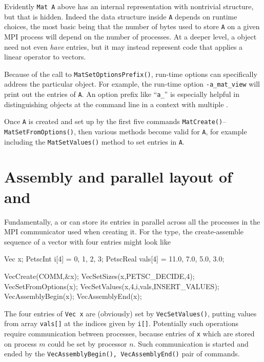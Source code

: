 Evidently \texttt{Mat A} above has an internal representation with nontrivial structure, but that is hidden.  Indeed the data structure inside \texttt{A} depends on runtime choices, the most basic being that the number of bytes used to store \texttt{A} on a given MPI process will depend on the number of processes.  At a deeper level, a \PETSc \pMat object need not even \emph{have} entries, but it may instead represent code that applies a linear operator to vectors.

Because of the call to \texttt{MatSetOptionsPrefix()}, run-time options can specifically address the particular \pMat object.  For example, the run-time option \texttt{-a\_mat\_view} will print out the entries of \texttt{A}.  An option prefix like ``\texttt{a\_}'' is especially helpful in distinguishing \pMat objects at the command line in a context with multiple \pMats.

Once \texttt{A} is created and set up by the first five commands \texttt{MatCreate()}--\texttt{MatSetFromOptions()}, then various methods become valid for \texttt{A}, for example including the \texttt{MatSetValues()} method to set entries in \texttt{A}.


\section{Assembly and parallel layout of \pVecs and \pMats}

Fundamentally, a \pVec or \pMat can store its entries in parallel across all the processes in the MPI communicator used when creating it.  For the \pVec type, the create-assemble sequence of a vector with four entries might look like
\begin{code}
Vec x;
PetscInt   i[4] = {0, 1, 2, 3};
PetscReal  vals[4] = {11.0, 7.0, 5.0, 3.0};

VecCreate(COMM,&x);
VecSetSizes(x,PETSC_DECIDE,4);
VecSetFromOptions(x);
VecSetValues(x,4,i,vals,INSERT_VALUES);
VecAssemblyBegin(x);
VecAssemblyEnd(x);
\end{code}
The four entries of \texttt{Vec x} are (obviously) set by \texttt{VecSetValues()}, putting values from array \texttt{vals[]} at the indices given by \texttt{i[]}.  Potentially such operations require communication between processes, because entries of \texttt{x} which are stored on process $m$ could be set by processor $n$.  Such communication is started and ended by the \texttt{VecAssemblyBegin(), VecAssemblyEnd()} pair of commands.

